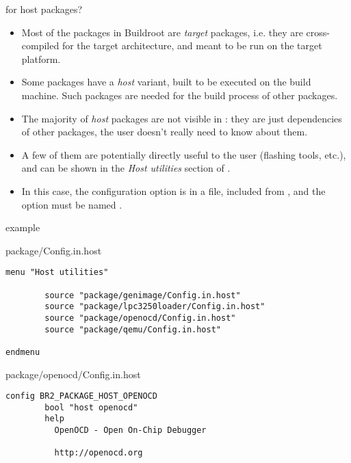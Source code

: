 \begin{frame}{ for host packages?}
  \begin{itemize}
  \item Most of the packages in Buildroot are {\em target} packages,
    i.e. they are cross-compiled for the target architecture, and meant
    to be run on the target platform.
  \item Some packages have a {\em host} variant, built to be executed
    on the build machine. Such packages are needed for the build
    process of other packages.
  \item The majority of {\em host} packages are not visible in
    : they are just dependencies of other packages,
    the user doesn't really need to know about them.
  \item A few of them are potentially directly useful to the user
    (flashing tools, etc.), and can be shown in the {\em Host
      utilities} section of .
  \item In this case, the configuration option is in a
     file, included from
    , and the option must be named
    .
  \end{itemize}
\end{frame}

\begin{frame}[fragile]{ example}
  \begin{block}{package/Config.in.host}
    \tiny
\begin{verbatim}
menu "Host utilities"

        source "package/genimage/Config.in.host"
        source "package/lpc3250loader/Config.in.host"
        source "package/openocd/Config.in.host"
        source "package/qemu/Config.in.host"

endmenu
\end{verbatim}
  \end{block}

  \begin{block}{package/openocd/Config.in.host}
    \tiny
\begin{verbatim}
config BR2_PACKAGE_HOST_OPENOCD
        bool "host openocd"
        help
          OpenOCD - Open On-Chip Debugger

          http://openocd.org
\end{verbatim}
  \end{block}
\end{frame}

